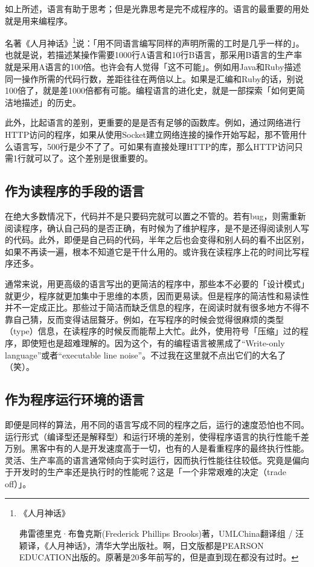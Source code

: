 \documentclass[a4paper,12pt]{article}
\begin{document}
如上所述，语言有助于思考；但是光靠思考是完不成程序的。语言的最重要的用处就是用来编程序。

名著《人月神话》\footnote{《人月神话》

弗雷德里克·布鲁克斯(Frederick Phillips Brooks)著，UMLChina翻译组 / 汪颖译，《人月神话》，清华大学出版社。啊，日文版都是PEARSON EDUCATION出版的。原著是20多年前写的，但是直到现在都没有过时。}说：「用不同语言编写同样的声明所需的工时是几乎一样的」。也就是说，若描述某操作需要1000行A语言和10行B语言，那采用B语言的生产率就是采用A语言的100倍。也许会有人觉得「这不可能」。例如用Java和Ruby描述同一操作所需的代码行数，差距往往在两倍以上。如果是汇编和Ruby的话，别说100倍了，就是差1000倍都有可能。编程语言的进化史，就是一部探索「如何更简洁地描述」的历史。

此外，比起语言的差别，更重要的是是否有足够的函数库。例如，通过网络进行HTTP访问的程序，如果从使用Socket建立网络连接的操作开始写起，那不管用什么语言写，500行是少不了了。可如果有直接处理HTTP的库，那么HTTP访问只需1行就可以了。这个差别是很重要的。

\subsection{作为读程序的手段的语言}

在绝大多数情况下，代码并不是只要码完就可以置之不管的。若有bug，则需重新阅读程序，确认自己码的是否正确，有时候为了维护程序，是不是还得阅读别人写的代码。此外，即便是自己码的代码，半年之后也会变得和别人码的看不出区别，如果不再读一遍，根本不知道它是干什么用的。或许我在读程序上花的时间比写程序还多。

通常来说，用更高级的语言写出的更简洁的程序中，那些本不必要的「设计模式」就更少，程序就更加集中于思维的本质，因而更易读。但是程序的简洁性和易读性并不一定成正比。那些过于简洁而缺乏信息的程序，在阅读时就有很多地方不得不靠自己猜，反而变得诘屈聱牙。例如，在写程序的时候会觉得很麻烦的类型（type）信息，在读程序的时候反而能帮上大忙。此外，使用符号「压缩」过的程序，即使短也是超难理解的。因为这个，有的编程语言被黑成了“Write-only language”或者“executable line noise”。不过我在这里就不点出它们的大名了（笑）。

\subsection{作为程序运行环境的语言}

即便是同样的算法，用不同的语言写成不同的程序之后，运行的速度恐怕也不同。运行形式（编译型还是解释型）和运行环境的差别，使得程序语言的执行性能千差万别。黑客中有的人是开发速度高于一切，也有的人是看重程序的最终执行性能。灵活、生产率高的语言通常倾向于实时运行，因而执行性能往往较低。究竟是偏向于开发时的生产率还是执行时的性能呢？这是「一个非常艰难的决定（trade off）」。
\end{document}
